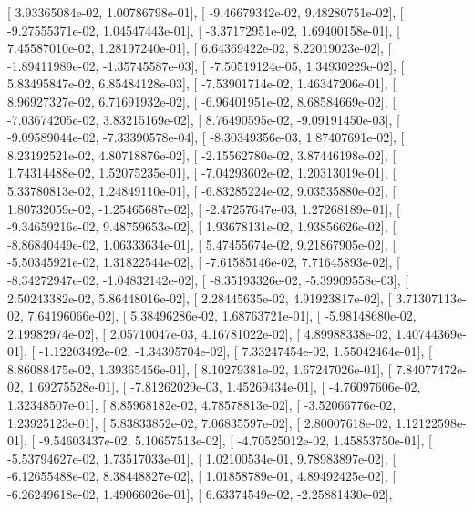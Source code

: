 \documentclass{article}
\begin{document}
       [  3.93365084e-02,   1.00786798e-01],
       [ -9.46679342e-02,   9.48280751e-02],
       [ -9.27555371e-02,   1.04547443e-01],
       [ -3.37172951e-02,   1.69400158e-01],
       [  7.45587010e-02,   1.28197240e-01],
       [  6.64369422e-02,   8.22019023e-02],
       [ -1.89411989e-02,  -1.35745587e-03],
       [ -7.50519124e-05,   1.34930229e-02],
       [  5.83495847e-02,   6.85484128e-03],
       [ -7.53901714e-02,   1.46347206e-01],
       [  8.96927327e-02,   6.71691932e-02],
       [ -6.96401951e-02,   8.68584669e-02],
       [ -7.03674205e-02,   3.83215169e-02],
       [  8.76490595e-02,  -9.09191450e-03],
       [ -9.09589044e-02,  -7.33390578e-04],
       [ -8.30349356e-03,   1.87407691e-02],
       [  8.23192521e-02,   4.80718876e-02],
       [ -2.15562780e-02,   3.87446198e-02],
       [  1.74314488e-02,   1.52075235e-01],
       [ -7.04293602e-02,   1.20313019e-01],
       [  5.33780813e-02,   1.24849110e-01],
       [ -6.83285224e-02,   9.03535880e-02],
       [  1.80732059e-02,  -1.25465687e-02],
       [ -2.47257647e-03,   1.27268189e-01],
       [ -9.34659216e-02,   9.48759653e-02],
       [  1.93678131e-02,   1.93856626e-02],
       [ -8.86840449e-02,   1.06333634e-01],
       [  5.47455674e-02,   9.21867905e-02],
       [ -5.50345921e-02,   1.31822544e-02],
       [ -7.61585146e-02,   7.71645893e-02],
       [ -8.34272947e-02,  -1.04832142e-02],
       [ -8.35193326e-02,  -5.39909558e-03],
       [  2.50243382e-02,   5.86448016e-02],
       [  2.28445635e-02,   4.91923817e-02],
       [  3.71307113e-02,   7.64196066e-02],
       [  5.38496286e-02,   1.68763721e-01],
       [ -5.98148680e-02,   2.19982974e-02],
       [  2.05710047e-03,   4.16781022e-02],
       [  4.89988338e-02,   1.40744369e-01],
       [ -1.12203492e-02,  -1.34395704e-02],
       [  7.33247454e-02,   1.55042464e-01],
       [  8.86088475e-02,   1.39365456e-01],
       [  8.10279381e-02,   1.67247026e-01],
       [  7.84077472e-02,   1.69275528e-01],
       [ -7.81262029e-03,   1.45269434e-01],
       [ -4.76097606e-02,   1.32348507e-01],
       [  8.85968182e-02,   4.78578813e-02],
       [ -3.52066776e-02,   1.23925123e-01],
       [  5.83833852e-02,   7.06835597e-02],
       [  2.80007618e-02,   1.12122598e-01],
       [ -9.54603437e-02,   5.10657513e-02],
       [ -4.70525012e-02,   1.45853750e-01],
       [ -5.53794627e-02,   1.73517033e-01],
       [  1.02100534e-01,   9.78983897e-02],
       [ -6.12655488e-02,   8.38448827e-02],
       [  1.01858789e-01,   4.89492425e-02],
       [ -6.26249618e-02,   1.49066026e-01],
       [  6.63374549e-02,  -2.25881430e-02],
\end{document}
